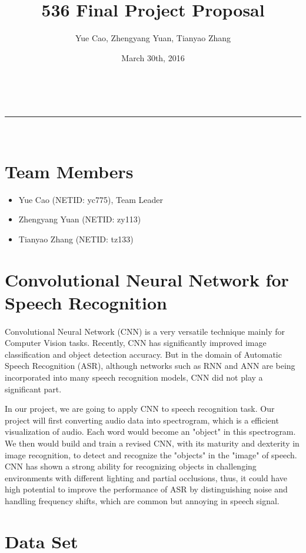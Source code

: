 \documentclass[a4paper,11pt]{article}
\makeatletter
\newcommand{\linia}{\rule{\linewidth}{0.5pt}}
\theoremstyle{mytheor}
\renewcommand{\maketitle}{
\begin{center}
\vspace{2ex}
{\huge \textsc{\@title}}
\vspace{1ex}
\\
\linia\\
\@author \hfill \@date
\vspace{4ex}
\end{center}
}
\makeatother
\begin{document}
\title{536 Final Project Proposal}

\author{Yue Cao, Zhengyang Yuan, Tianyao Zhang}

\date{March 30th, 2016}

\maketitle
\section{Team Members}
\begin{itemize}
    \item {Yue Cao (NETID: yc775), Team Leader}
    \item {Zhengyang Yuan (NETID: zy113)}
    \item {Tianyao Zhang (NETID: tz133)}
\end{itemize}

\section{Convolutional Neural Network for Speech Recognition}
\paragraph{}
Convolutional Neural Network (CNN) is a very versatile technique mainly for Computer Vision tasks. Recently, CNN has significantly improved image classification and object detection accuracy. But in the domain of Automatic Speech Recognition (ASR), although networks such as RNN and ANN are being incorporated into many speech recognition models, CNN did not play a significant part. 

In our project, we are going to apply CNN to speech recognition task. Our project will first converting audio data into spectrogram, which is a efficient visualization of audio. Each word would become an "object" in this spectrogram. We then would build and train a revised CNN, with its maturity and dexterity in image recognition, to detect and recognize the "objects" in the "image" of speech. CNN has shown a strong ability for recognizing objects in challenging environments with different lighting and partial occlusions, thus, it could have high potential to improve the performance of ASR by distinguishing noise and handling frequency shifts, which are common but annoying in speech signal.
\section{Data Set}
\end{document}
